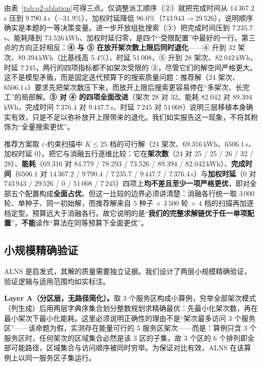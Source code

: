 由表~\ref{tab:q2-ablation}可得三点。仅调整派工顺序（②）就把完成时间从 $14\,367.2$\,s 压到 $9\,790.4$\,s（$-31.9\%$）、加权时延降低 $96.0\%$（$743\,943\to29\,526$），说明顺序确实是本题的一等决策变量。进一步开放组批搜索（③）把完成时间压到 $7\,235.7$\,s、能耗降到 $73.526$\,kWh、加权时延归零，是四个“受限配置”中最好的一行。第三点的方向正好相反：\textbf{④ 与 ⑤ 在放开架次数上限后同时退化}——④ 升到 32 架次、$89.394$\,kWh（比基线高 $5.4\%$）、时延 $51\,008$，⑤ 升到 28 架次、$82.042$\,kWh、时延 $7\,245$，两行的四项指标都不如架次受限的 ③，尽管它们的解空间严格更大。这不是模型矛盾，而是固定迭代预算下的搜索质量问题：推荐解（24 架次、$6506.1$\,s）要求先把架次数压下来，而放开上限后搜索更容易停在“多架次、长完工”的局部解。\textbf{⑤ 对 ④ 的四项全面改进}（架次 28 对 32、能耗 82.042 对 89.394\,kWh、完成时间 $7\,376.4$ 对 $9\,447.7$\,s、时延 $7\,245$ 对 $51\,008$）说明三层移植本身确实有效，只是不足以弥补放开上限带来的退化。我们如实报告这一现象，不将其粉饰为“全量搜索更优”。

推荐方案取 $\varepsilon$-约束扫描中 $K\le25$ 档的可行解（24 架次、69.316\,kWh、$6506.1$\,s、加权时延 0）。把它与消融五行逐维比较：它在\textbf{架次数}（24 对 25 / 25 / 26 / 32 / 28）、\textbf{能耗}（69.316 对 84.779 / 78.293 / 73.526 / 89.394 / 82.042\,kWh）、\textbf{完成时间}（$6506.1$ 对 $14\,367.2$ / $9\,790.4$ / $7\,235.7$ / $9\,447.7$ / $7\,376.4$\,s）与\textbf{加权时延}（0 对 $743\,943$ / $29\,526$ / 0 / $51\,008$ / $7\,245$）四项上\textbf{均不差且至少一项严格更优}，即对全部五个配置构成\textbf{全面占优}。但这一比较的边界必须讲清楚：消融各行统一取 $3\,000$ 轮、单种子、同一初始解，而推荐解来自 $5$ 种子 $\times$ $3\,500$ 轮 $\times$ $4$ 档的扫描再加逐档定型，预算远大于消融各行。故它说明的是“\textbf{我们的完整求解链优于任一单项配置}”，\textbf{不能}读作“算法在同等预算下全面更优”。

\subsection{小规模精确验证}

ALNS 是启发式，其解的质量需要独立证据。我们设计了两层小规模精确验证，验证逻辑与适用范围均如实标注。

\textbf{Layer A（分区层，无路径简化）。}取 3 个服务区构成小算例，穷举全部架次模式（列生成）后用两层字典序集合划分整数规划求精确最优：先最小化架次数，再在最小架次下最小化能耗。这里必须说明正确性的理由不是“架次最多访问 3 个服务区”——该命题为假，实测存在能量可行的 5 服务区架次——而是：算例只含 3 个服务区时，任何架次的区域集合必然是该 3 区的子集，故 3 个区的 6 个排列即全部可能路径，区域集合与访问顺序被同时穷举。为保证对比有效，ALNS 在该算例上以同一服务区子集运行。

